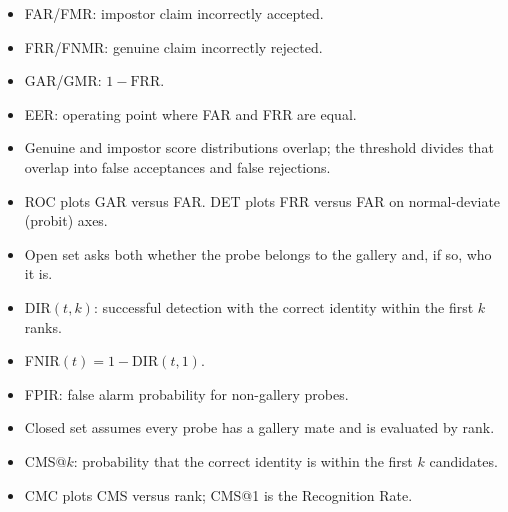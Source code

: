 \documentclass[11pt,a4paper,oneside]{report}
\begin{document}
\begin{minipage}[t]{0.485\textwidth}
\vspace{0pt}
\begin{metricbox}[ -- Verification]
\begin{itemize}[leftmargin=*,itemsep=0.18em,topsep=0.25em]
    \item FAR/FMR: impostor claim incorrectly accepted.
    \item FRR/FNMR: genuine claim incorrectly rejected.
    \item GAR/GMR: \(1-\mathrm{FRR}\).
    \item EER: operating point where FAR and FRR are equal.
    \item Genuine and impostor score distributions overlap; the threshold divides that overlap into false acceptances and false rejections.
    \item ROC plots GAR versus FAR. DET plots FRR versus FAR on normal-deviate (probit) axes.
\end{itemize}
\end{metricbox}


\begin{metricbox}[ -- Identification]
\begin{itemize}[leftmargin=*,itemsep=0.18em,topsep=0.25em]
    \item Open set asks both whether the probe belongs to the gallery and, if so, who it is.
    \item DIR\((t,k)\): successful detection with the correct identity within the first \(k\) ranks.
    \item FNIR\((t)=1-\mathrm{DIR}(t,1)\).
    \item FPIR: false alarm probability for non-gallery probes.
    \item Closed set assumes every probe has a gallery mate and is evaluated by rank.
    \item CMS@\(k\): probability that the correct identity is within the first \(k\) candidates.
    \item CMC plots CMS versus rank; CMS@1 is the Recognition Rate.
\end{itemize}
\end{metricbox}

\end{minipage}\par
\endgroup
\clearpage
\begingroup
{}
\end{document}
